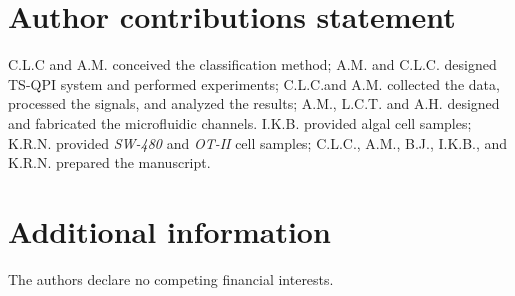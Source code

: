\documentclass[aps,pra,reprint,longbibliography,superscriptaddress]{revtex4-1}
\begin{document}
\section*{Author contributions statement}

C.L.C and A.M. conceived the classification method; A.M. and C.L.C. designed TS-QPI system and performed experiments; C.L.C.and A.M. collected the data, processed the signals, and analyzed the results;  A.M., L.C.T. and A.H. designed and fabricated the microfluidic channels. I.K.B. provided algal cell samples; K.R.N. provided \textit{SW-480} and \textit{OT-II} cell samples; C.L.C., A.M., B.J., I.K.B., and K.R.N. prepared the manuscript. 

\section*{Additional information}

The authors declare no competing financial interests.
\end{document}
